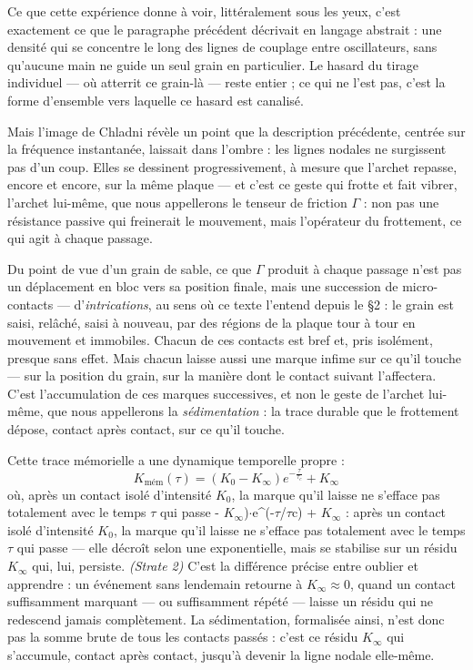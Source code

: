 \documentclass[french, 11pt, twoside, openright, a5paper]{book}
\begin{document}
Ce que cette expérience donne à voir, littéralement sous les yeux, c'est
exactement ce que le paragraphe précédent décrivait en langage abstrait
: une densité qui se concentre le long des lignes de couplage entre
oscillateurs, sans qu'aucune main ne guide un seul grain en particulier.
Le hasard du tirage individuel --- où atterrit ce grain-là --- reste
entier ; ce qui ne l'est pas, c'est la forme d'ensemble vers laquelle ce
hasard est canalisé.

Mais l'image de Chladni révèle un point que la description précédente,
centrée sur la fréquence instantanée, laissait dans l'ombre : les lignes
nodales ne surgissent pas d'un coup. Elles se dessinent progressivement,
à mesure que l'archet repasse, encore et encore, sur la même plaque ---
et c'est ce geste qui frotte et fait vibrer, l'archet lui-même, que nous
appellerons le tenseur de friction $\Gamma$ : non pas une résistance passive
qui freinerait le mouvement, mais l'opérateur du frottement, ce qui agit
à chaque passage.

Du point de vue d'un grain de sable, ce que $\Gamma$ produit à chaque passage
n'est pas un déplacement en bloc vers sa position finale, mais une
succession de micro-contacts --- d'\emph{intrications}, au sens où ce
texte l'entend depuis le §2 : le grain est saisi, relâché, saisi à
nouveau, par des régions de la plaque tour à tour en mouvement et
immobiles. Chacun de ces contacts est bref et, pris isolément, presque
sans effet. Mais chacun laisse aussi une marque infime sur ce qu'il
touche --- sur la position du grain, sur la manière dont le contact
suivant l'affectera. C'est l'accumulation de ces marques successives, et
non le geste de l'archet lui-même, que nous appellerons la
\emph{sédimentation} : la trace durable que le frottement dépose,
contact après contact, sur ce qu'il touche.

Cette trace mémorielle a une dynamique temporelle propre :
\[ K_{\text{mém}}(\tau) = (K_0 - K_\infty) e^{-\frac{\tau}{\tau_c}} + K_\infty \]
où, après un contact isolé d'intensité $K_0$, la marque qu'il laisse ne s'efface pas totalement avec le temps $\tau$ qui passe
- $K_\infty$)$\cdot$e\^{}(-$\tau$/$\tau$c) + $K_\infty$ : après un contact isolé d'intensité $K_0$, la
marque qu'il laisse ne s'efface pas totalement avec le temps $\tau$ qui passe
--- elle décroît selon une exponentielle, mais se stabilise sur un
résidu $K_\infty$ qui, lui, persiste. \emph{(Strate 2)} C'est la différence
précise entre oublier et apprendre : un événement sans lendemain
retourne à $K_\infty \approx 0$, quand un contact suffisamment marquant --- ou
suffisamment répété --- laisse un résidu qui ne redescend jamais
complètement. La sédimentation, formalisée ainsi, n'est donc pas la
somme brute de tous les contacts passés : c'est ce résidu $K_\infty$ qui
s'accumule, contact après contact, jusqu'à devenir la ligne nodale
elle-même.
\end{document}
